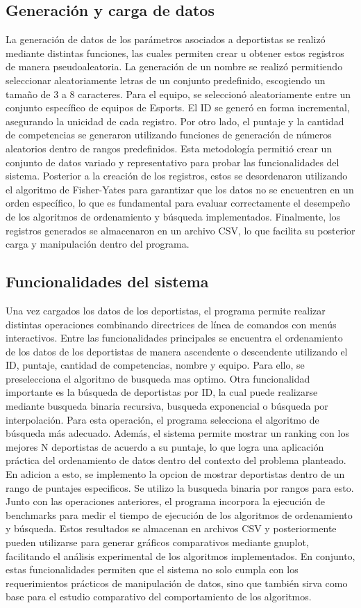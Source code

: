 \subsection{Generación y carga de datos}
La generación de datos de los parámetros asociados a deportistas se realizó mediante distintas funciones, las cuales permiten crear u obtener estos registros de manera pseudoaleatoria. La generación de un nombre se realizó permitiendo seleccionar aleatoriamente letras de un conjunto predefinido, escogiendo un tamaño de 3 a 8 caracteres. Para el equipo, se seleccionó aleatoriamente entre un conjunto específico de equipos de Esports. El ID se generó en forma incremental, asegurando la unicidad de cada registro. Por otro lado, el puntaje y la cantidad de competencias se generaron utilizando funciones de generación de números aleatorios dentro de rangos predefinidos. Esta metodología permitió crear un conjunto de datos variado y representativo para probar las funcionalidades del sistema. Posterior a la creación de los registros, estos se desordenaron utilizando el algoritmo de Fisher-Yates para garantizar que los datos no se encuentren en un orden específico, lo que es fundamental para evaluar correctamente el desempeño de los algoritmos de ordenamiento y búsqueda implementados. Finalmente, los registros generados se almacenaron en un archivo CSV, lo que facilita su posterior carga y manipulación dentro del programa.


\subsection{Funcionalidades del sistema}
Una vez cargados los datos de los deportistas, el programa permite realizar distintas operaciones combinando directrices de línea de comandos con menús interactivos.
Entre las funcionalidades principales se encuentra el ordenamiento de los datos de los deportistas de
manera ascendente o descendente utilizando el ID, puntaje, cantidad de competencias, nombre y equipo. Para ello, se preselecciona el algoritmo de busqueda mas optimo. Otra funcionalidad importante es la búsqueda de deportistas por ID, la cual puede realizarse mediante busqueda binaria recursiva, busqueda exponencial o búsqueda por interpolación. Para esta operación, el programa selecciona el algoritmo de búsqueda más adecuado.
Además, el sistema permite mostrar un ranking con los mejores N deportistas de acuerdo a su puntaje, lo que logra una aplicación práctica del ordenamiento de datos dentro del contexto del problema planteado. En adicion a esto, se implemento la opcion de mostrar deportistas dentro de un rango de puntajes especificos. Se utilizo la busqueda binaria por rangos para esto. Junto con las operaciones anteriores, el programa incorpora la ejecución de benchmarks para medir el tiempo de ejecución de los algoritmos de ordenamiento y búsqueda. Estos resultados se almacenan en archivos CSV y posteriormente pueden utilizarse para generar gráficos comparativos mediante gnuplot, facilitando el análisis experimental de los algoritmos implementados. En conjunto, estas funcionalidades permiten que el sistema no solo cumpla con los requerimientos prácticos de manipulación de datos, sino que también sirva como base para el estudio comparativo del comportamiento de los algoritmos.


